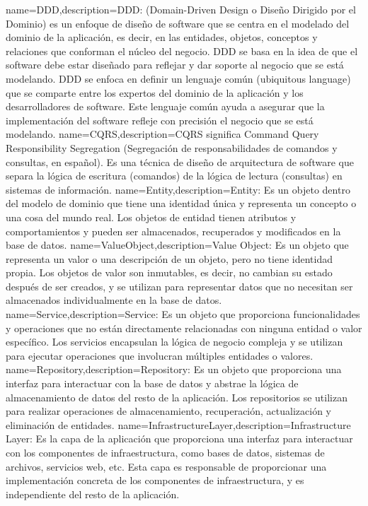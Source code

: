  {name={DDD},description={DDD: (Domain-Driven Design o Diseño Dirigido por el Dominio) es un enfoque de diseño de software que se centra en el modelado del dominio de la aplicación, es decir, en las entidades, objetos, conceptos y relaciones que conforman el núcleo del negocio. DDD se basa en la idea de que el software debe estar diseñado para reflejar y dar soporte al negocio que se está modelando. DDD se enfoca en definir un lenguaje común (ubiquitous language) que se comparte entre los expertos del dominio de la aplicación y los desarrolladores de software. Este lenguaje común ayuda a asegurar que la implementación del software refleje con precisión el negocio que se está modelando.}}
 {name={CQRS},description={CQRS significa Command Query Responsibility Segregation (Segregación de responsabilidades de comandos y consultas, en español). Es una técnica de diseño de arquitectura de software que separa la lógica de escritura (comandos) de la lógica de lectura (consultas) en sistemas de información.}}
 {name={Entity},description={Entity: Es un objeto dentro del modelo de dominio que tiene una identidad única y representa un concepto o una cosa del mundo real. Los objetos de entidad tienen atributos y comportamientos y pueden ser almacenados, recuperados y modificados en la base de datos.}}
 {name={ValueObject},description={Value Object: Es un objeto que representa un valor o una descripción de un objeto, pero no tiene identidad propia. Los objetos de valor son inmutables, es decir, no cambian su estado después de ser creados, y se utilizan para representar datos que no necesitan ser almacenados individualmente en la base de datos.}}
 {name={Service},description={Service: Es un objeto que proporciona funcionalidades y operaciones que no están directamente relacionadas con ninguna entidad o valor específico. Los servicios encapsulan la lógica de negocio compleja y se utilizan para ejecutar operaciones que involucran múltiples entidades o valores.}}
 {name={Repository},description={Repository: Es un objeto que proporciona una interfaz para interactuar con la base de datos y abstrae la lógica de almacenamiento de datos del resto de la aplicación. Los repositorios se utilizan para realizar operaciones de almacenamiento, recuperación, actualización y eliminación de entidades.}}
 {name={InfrastructureLayer},description={Infrastructure Layer: Es la capa de la aplicación que proporciona una interfaz para interactuar con los componentes de infraestructura, como bases de datos, sistemas de archivos, servicios web, etc. Esta capa es responsable de proporcionar una implementación concreta de los componentes de infraestructura, y es independiente del resto de la aplicación.}}
